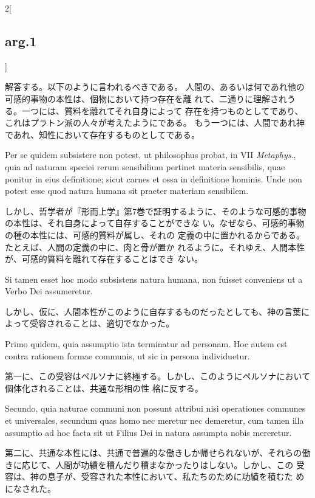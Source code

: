 \documentclass[paper=a4paper,fontsize=10pt,jafontsize=9pt,titlepage]{jlreq}
\begin{document}
\begin{paracol}{2}[\subsection{arg.1}]
\switchcolumn

解答する。以下のように言われるべきである。
人間の、あるいは何であれ他の可感的事物の本性は、個物において持つ存在を離
 れて、二通りに理解されうる。一つには、質料を離れてそれ自身によって
 存在を持つものとしてであり、これはプラトン派の人々が考えたようにである。
 もう一つには、人間であれ神であれ、知性において存在するものとしてである。

\switchcolumn*

Per se quidem subsistere non potest, ut philosophus
probat, in VII {\itshape Metaphys}., quia ad naturam speciei rerum sensibilium
pertinet materia sensibilis, quae ponitur in eius definitione; sicut
carnes et ossa in definitione hominis. 
Unde non potest esse quod natura
humana sit praeter materiam sensibilem.

\switchcolumn

しかし、哲学者が『形而上学』第7巻で証明するように、そのような可感的事物の本性は、それ自身によって自存することができな
 い。なぜなら、可感的事物の種の本性には、可感的質料が属し、それの
 定義の中に置かれるからである。たとえば、人間の定義の中に、肉と骨が置か
 れるように。それゆえ、人間本性が、可感的質料を離れて存在することはでき
 ない。

\switchcolumn*

Si tamen esset hoc modo
subsistens natura humana, non fuisset conveniens ut a Verbo Dei
assumeretur.

\switchcolumn

しかし、仮に、人間本性がこのように自存するものだったとしても、神の言葉に
 よって受容されることは、適切でなかった。

\switchcolumn*

Primo quidem, quia assumptio ista terminatur ad
personam. Hoc autem est contra rationem formae communis, ut sic in
persona individuetur.

\switchcolumn

第一に、この受容はペルソナに終極する。しかし、このようにペルソナにおいて
 個体化されることは、共通な形相の性
 格に反する。

\switchcolumn*

Secundo, quia naturae communi non possunt attribui
nisi operationes communes et universales, secundum quas homo nec meretur
nec demeretur, cum tamen illa assumptio ad hoc facta sit ut Filius Dei
in natura assumpta nobis mereretur.

\switchcolumn

第二に、共通な本性には、共通で普遍的な働きしか帰せられないが、それらの働
 きに応じて、人間が功績を積んだり積まなかったりはしない。しかし、この
 受容は、神の息子が、受容された本性において、私たちのために功績を積むた
 めになされた。


\end{paracol}
\end{document}
